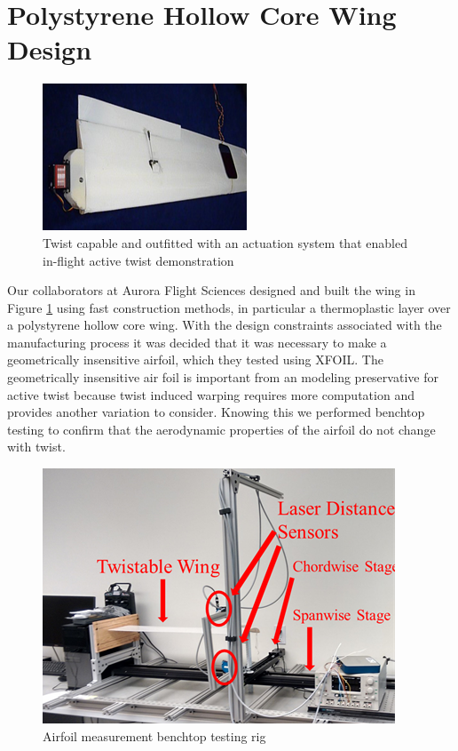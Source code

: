 \documentclass[11pt]{ucthesis}
\begin{document}
\section{Polystyrene Hollow Core Wing Design}

\begin{figure}[thpb]
\centering
\includegraphics[width=0.5\linewidth]{Figures/AuroraWing.png}
\caption{Twist capable and outfitted with an actuation system that enabled in-flight active twist demonstration}
\label{fig:Awing}
\end{figure}

Our collaborators at Aurora Flight Sciences designed and built the wing in Figure \ref{fig:Awing} using fast construction methods, in particular a thermoplastic layer over a polystyrene hollow core wing. With the design constraints associated with the manufacturing process it was decided that it was necessary to make a geometrically insensitive airfoil, which they tested using XFOIL. The geometrically insensitive air foil is important from an modeling preservative for active twist because twist induced warping requires more computation and provides another variation to consider. Knowing this we performed benchtop testing to confirm that the aerodynamic properties of the airfoil do not change with twist.

\begin{figure}[thpb]
\centering
\includegraphics[width=0.75\linewidth]{Figures/AuroraWingBenchtopTest.png}
\caption{Airfoil measurement benchtop testing rig}
\label{fig:Atestrig}
\end{figure}
\end{document}
